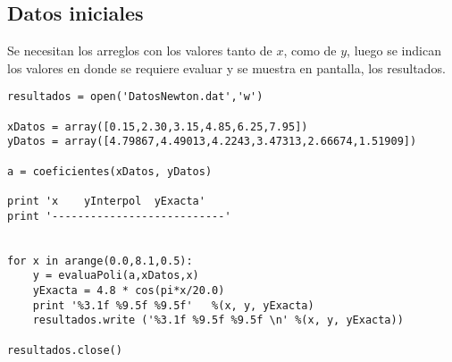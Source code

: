 \documentclass[11pt]{article}
\begin{document}
\subsection{Datos iniciales}
Se necesitan los arreglos con los valores tanto de $x$, como de $y$, luego se indican los valores en donde se requiere evaluar y se muestra en pantalla, los resultados.
\begin{lstlisting}
resultados = open('DatosNewton.dat','w')

xDatos = array([0.15,2.30,3.15,4.85,6.25,7.95])
yDatos = array([4.79867,4.49013,4.2243,3.47313,2.66674,1.51909])

a = coeficientes(xDatos, yDatos)

print 'x    yInterpol  yExacta'
print '---------------------------'


for x in arange(0.0,8.1,0.5):
    y = evaluaPoli(a,xDatos,x)
    yExacta = 4.8 * cos(pi*x/20.0)
    print '%3.1f %9.5f %9.5f'   %(x, y, yExacta)
    resultados.write ('%3.1f %9.5f %9.5f \n' %(x, y, yExacta))

resultados.close()
\end{lstlisting}
\end{document}
